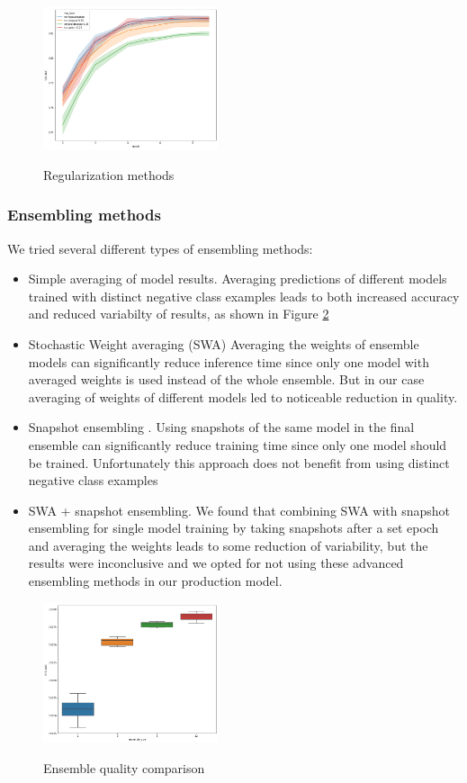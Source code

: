 \documentclass[sigconf]{acmart}
\begin{document}
\begin{figure}[ht]
  \caption{Regularization methods}
  \includegraphics[width=0.46\textwidth]{figures/do-pic.png}
  \label{fig-reg}
\end{figure}


\subsubsection{Ensembling methods}

We tried several different types of ensembling methods:
\begin{itemize}
\item Simple averaging of model results. Averaging predictions of different models trained with distinct negative class examples leads to both increased accuracy and reduced variabilty of results, as shown in Figure \ref{fig-ens}
\item Stochastic Weight averaging (SWA) \cite{DBLP:journals/corr/LoshchilovH16a}  Averaging the weights of ensemble models can significantly reduce inference time since only one model with averaged weights is used instead of the whole ensemble. But in our case averaging of weights of different models led to noticeable reduction in quality.
\item Snapshot ensembling \cite{DBLP:journals/corr/HuangLPLHW17}. Using snapshots of the same model in the final ensemble can significantly reduce training time since only one model should be trained. Unfortunately this approach does not benefit from using distinct negative class examples 
\item SWA + snapshot ensembling. We found that combining SWA with snapshot ensembling for single model training by taking snapshots after a set epoch and averaging the weights leads to some reduction of variability, but the results were inconclusive and we opted for not using these advanced ensembling methods in our production model.
\end{itemize}

\begin{figure}[ht]
  \caption{Ensemble quality comparison}
  \includegraphics[width=0.46\textwidth]{figures/ensemble-pic.png}
  \label{fig-ens}
\end{figure}
\end{document}
